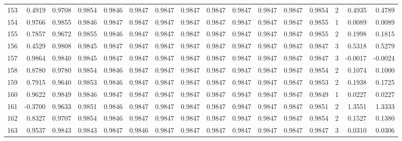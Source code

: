 \begin{tabular}{lrrrrrrrrrrrrrrr}
153 &      0.4919 &  0.9708 &  0.9854 &  0.9846 &  0.9847 &  0.9847 &  0.9847 &  0.9847 &  0.9847 &  0.9847 &   0.9847 &     0.9854 &      2 &                    0.4935 &                     0.4789 \\
154 &      0.9766 &  0.9855 &  0.9846 &  0.9847 &  0.9847 &  0.9847 &  0.9847 &  0.9847 &  0.9847 &  0.9847 &   0.9847 &     0.9855 &      1 &                    0.0089 &                     0.0089 \\
155 &      0.7857 &  0.9672 &  0.9855 &  0.9846 &  0.9847 &  0.9847 &  0.9847 &  0.9847 &  0.9847 &  0.9847 &   0.9847 &     0.9855 &      2 &                    0.1998 &                     0.1815 \\
156 &      0.4529 &  0.9808 &  0.9845 &  0.9847 &  0.9847 &  0.9847 &  0.9847 &  0.9847 &  0.9847 &  0.9847 &   0.9847 &     0.9847 &      3 &                    0.5318 &                     0.5279 \\
157 &      0.9864 &  0.9840 &  0.9845 &  0.9847 &  0.9847 &  0.9847 &  0.9847 &  0.9847 &  0.9847 &  0.9847 &   0.9847 &     0.9847 &      3 &                   -0.0017 &                    -0.0024 \\
158 &      0.8780 &  0.9780 &  0.9854 &  0.9846 &  0.9847 &  0.9847 &  0.9847 &  0.9847 &  0.9847 &  0.9847 &   0.9847 &     0.9854 &      2 &                    0.1074 &                     0.1000 \\
159 &      0.7915 &  0.9640 &  0.9853 &  0.9846 &  0.9847 &  0.9847 &  0.9847 &  0.9847 &  0.9847 &  0.9847 &   0.9847 &     0.9853 &      2 &                    0.1938 &                     0.1725 \\
160 &      0.9622 &  0.9849 &  0.9846 &  0.9847 &  0.9847 &  0.9847 &  0.9847 &  0.9847 &  0.9847 &  0.9847 &   0.9847 &     0.9849 &      1 &                    0.0227 &                     0.0227 \\
161 &     -0.3700 &  0.9633 &  0.9851 &  0.9846 &  0.9847 &  0.9847 &  0.9847 &  0.9847 &  0.9847 &  0.9847 &   0.9847 &     0.9851 &      2 &                    1.3551 &                     1.3333 \\
162 &      0.8327 &  0.9707 &  0.9854 &  0.9846 &  0.9847 &  0.9847 &  0.9847 &  0.9847 &  0.9847 &  0.9847 &   0.9847 &     0.9854 &      2 &                    0.1527 &                     0.1380 \\
163 &      0.9537 &  0.9843 &  0.9843 &  0.9847 &  0.9846 &  0.9847 &  0.9847 &  0.9847 &  0.9847 &  0.9847 &   0.9847 &     0.9847 &      3 &                    0.0310 &                     0.0306 \\

\end{tabular}
